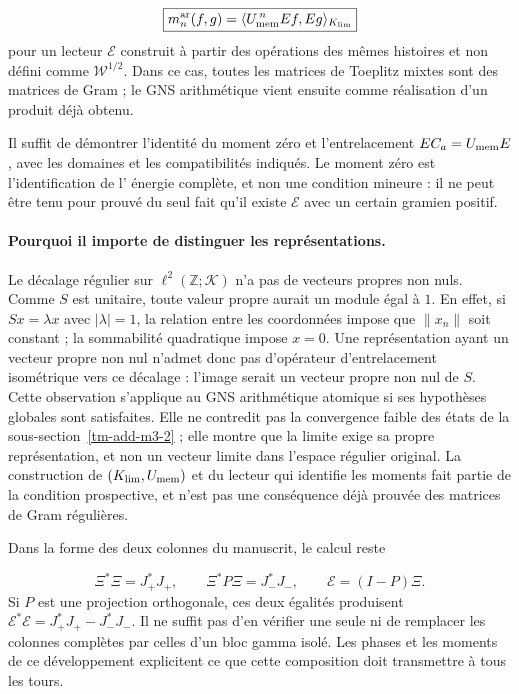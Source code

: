 \[
\boxed{m_n^{\mathrm{ar}}(f,g)
=\langle U_{\rm mem}^{\,n}\mathcal E f,\mathcal E g\rangle_{\mathcal K_{\rm lim}}}
\]
pour un lecteur \(\mathcal E\) construit à partir des opérations des mêmes histoires et non défini comme \(\mathscr W^{1/2}\). Dans ce cas, toutes les matrices de Toeplitz mixtes sont des matrices de Gram ; le GNS arithmétique vient ensuite comme réalisation d'un produit déjà obtenu.

Il suffit de démontrer l'identité du moment zéro et l'entrelacement
\(\mathcal E C_a=U_{\rm mem}\mathcal E\), avec les domaines et les
compatibilités indiqués. Le moment zéro est l'identification de l'
énergie complète, et non une condition mineure : il ne peut être tenu pour prouvé
du seul fait qu'il existe \(\mathcal E\) avec un certain gramien positif.

\paragraph{Pourquoi il importe de distinguer les représentations.}
Le décalage régulier sur \(\ell^2(\mathbb Z;\mathcal K)\)
n'a pas de vecteurs propres non nuls. Comme \(S\) est unitaire, toute
valeur propre aurait un module égal à \(1\). En effet, si \(Sx=\lambda x\)
avec \(|\lambda|=1\), la relation entre les coordonnées impose que
\(\|x_n\|\) soit constant ; la sommabilité quadratique impose \(x=0\).
Une représentation ayant un vecteur propre non nul n'admet donc pas
d'opérateur d'entrelacement isométrique vers ce décalage : l'image serait
un vecteur propre non nul de \(S\). Cette observation s'applique au
GNS arithmétique atomique si ses hypothèses globales sont satisfaites. Elle ne
contredit pas la convergence faible des états de la
sous-section~\ref{tm-add-m3-2} ; elle montre que la limite exige sa propre
représentation, et non un vecteur limite dans l'espace régulier original.
La construction de \((\mathcal K_{\rm lim},U_{\rm mem})\) et du
lecteur qui identifie les moments fait partie de la condition prospective,
et n'est pas une conséquence déjà prouvée des matrices de Gram régulières.

Dans la forme des deux colonnes du manuscrit, le calcul reste

\[
\Xi^*\Xi=J_+^*J_+,\qquad
\Xi^*P\Xi=J_-^*J_-,\qquad
\mathcal E=(I-P)\Xi.
\]
Si \(P\) est une projection orthogonale, ces deux égalités produisent \(\mathcal E^*\mathcal E=J_+^*J_+-J_-^*J_-\). Il ne suffit pas d'en vérifier une seule ni de remplacer les colonnes complètes par celles d'un bloc gamma isolé. Les phases et les moments de ce développement explicitent ce que cette composition doit transmettre à tous les tours.

